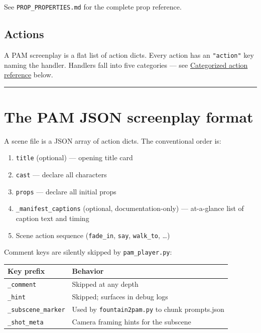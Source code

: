 \documentclass[
  11pt,
]{book}
\providecommand{\tightlist}{%
  \setlength{\itemsep}{0pt}\setlength{\parskip}{0pt}}
\begin{document}
See \texttt{PROP\_PROPERTIES.md} for the complete prop reference.

\subsection{Actions}\label{actions}

A PAM screenplay is a flat list of action dicts. Every action has an
\texttt{"action"} key naming the handler. Handlers fall into five
categories --- see \hyperref[categorized-action-reference]{Categorized
action reference} below.

\begin{center}\rule{0.5\linewidth}{0.5pt}\end{center}

\section{The PAM JSON screenplay
format}\label{the-pam-json-screenplay-format}

A scene file is a JSON array of action dicts. The conventional order is:

\begin{enumerate}
\def\labelenumi{\arabic{enumi}.}
\tightlist
\item
  \texttt{title} (optional) --- opening title card
\item
  \texttt{cast} --- declare all characters
\item
  \texttt{props} --- declare all initial props
\item
  \texttt{\_manifest\_captions} (optional, documentation-only) ---
  at-a-glance list of caption text and timing
\item
  Scene action sequence (\texttt{fade\_in}, \texttt{say},
  \texttt{walk\_to}, \ldots)
\end{enumerate}

Comment keys are silently skipped by \texttt{pam\_player.py}:

\begin{longtable}[]{@{}ll@{}}
\toprule\noalign{}
Key prefix & Behavior \\
\midrule\noalign{}
\endhead
\bottomrule\noalign{}
\endlastfoot
\texttt{\_comment} & Skipped at any depth \\
\texttt{\_hint} & Skipped; surfaces in debug logs \\
\texttt{\_subscene\_marker} & Used by \texttt{fountain2pam.py} to chunk
prompts.json \\
\texttt{\_shot\_meta} & Camera framing hints for the subscene \\
\end{longtable}
\end{document}
